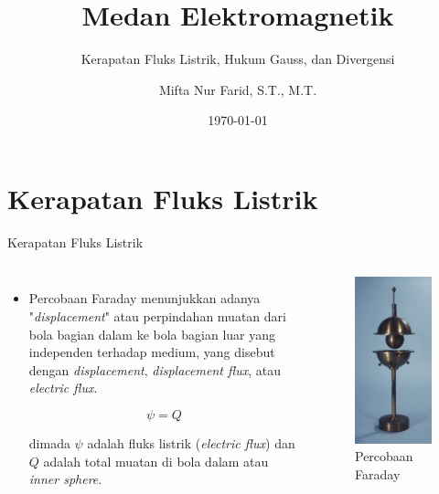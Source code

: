 \documentclass[10pt]{beamer}
\title{Medan Elektromagnetik}
\subtitle{Kerapatan Fluks Listrik, Hukum Gauss, dan Divergensi}
\date{\today}
\author{Mifta Nur Farid, S.T., M.T.}
\institute{Teknik Elektro - Institut Teknologi Kalimantan \\ Karang Joang, Balikpapan, Indonesia}
\begin{document}
\maketitle

\section{Kerapatan Fluks Listrik}

\begin{frame}{Kerapatan Fluks Listrik}
    \begin{columns}[T,onlytextwidth]
        
        \begin{itemize}
            \item Percobaan Faraday menunjukkan adanya "\emph{displacement}" atau perpindahan muatan dari bola bagian dalam ke bola bagian luar yang independen terhadap medium, yang disebut dengan \emph{displacement}, \emph{displacement flux}, atau \emph{electric flux}.
            
            $$ \psi = Q$$
            
            dimada $\psi$ adalah fluks listrik (\emph{electric flux}) dan $Q$ adalah total muatan di bola dalam atau \emph{inner sphere}.
        \end{itemize}
            
        \begin{figure}
            \includegraphics[width=0.5\linewidth]{chap03/faraday-exp.jpg}
            \caption{Percobaan Faraday}
          \end{figure}
    \end{columns}
\end{frame}
\end{document}
